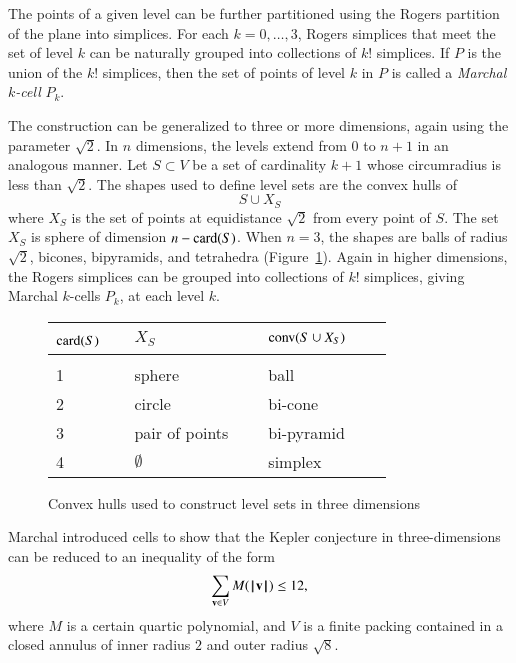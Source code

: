 \documentclass{llncs}
\begin{document}
The points of a given level can be further partitioned using the
Rogers partition of the plane into simplices.  For each
$k=0,\ldots,3$, Rogers simplices that meet the set of level $k$ can be
naturally grouped into collections of $k!$ simplices.  If $P$ is the
union of the $k!$ simplices, then the set of points of level $k$ in
$P$ is called a {\it Marchal $k$-cell} $P_k$.

The construction can be generalized to three or more dimensions,
again using the parameter $\sqrt2$.   In $n$ dimensions, the levels extend
from $0$ to $n+1$ in an analogous manner.  Let $S\subset V$ be a set of
cardinality $k+1$ whose circumradius is less than $\sqrt2$.
The shapes used to define level sets are the convex hulls of
\[
S \cup X_S
\]
where $X_S$ is the set of points at equidistance $\sqrt2$ from every
point of $S$. The set $X_S$ is sphere of dimension $n-{\operatorname{card}}(S)$. 
When $n=3$, the shapes are balls of radius $\sqrt2$,
bicones, bipyramids, and tetrahedra (Figure~\ref{fig:table}).  Again
in higher dimensions, the Rogers simplices can be grouped into
collections of $k!$ simplices, giving Marchal $k$-cells $P_k$, at each
level $k$.

\begin{figure}[h!]
\centering
\begin{tabular}{l l l l l}
\hline
${\operatorname{card}}(S)$~~ &$X_S$  
&${\operatorname{conv}}(S\cup X_S)$\\ [0.5ex]
\hline \\
1 &sphere& ball\\
2& circle& bi-cone\\
3& pair of points~~~& bi-pyramid\\
4& $\emptyset$ & simplex\\
 [1ex]
\hline
\end{tabular}
\caption{Convex hulls used to construct level sets in three dimensions}
\label{fig:table}
\end{figure}


\begin{remark} Marchal introduced cells to show that the Kepler
  conjecture in three-dimensions can be reduced to an inequality of
  the form
\[
\sum_{{\mathbf v}\in V} M({{\hskip0.1em|\hskip-0.15em|\hskip0.1em}{\mathbf v}{\hskip0.1em|\hskip-0.15em|\hskip0.1em}}) \le 12,
\]
where $M$ is a certain quartic polynomial, and $V$ is a finite packing 
contained in a closed annulus of inner radius $2$ and outer
radius $\sqrt8$.  
\end{remark}
\end{document}

